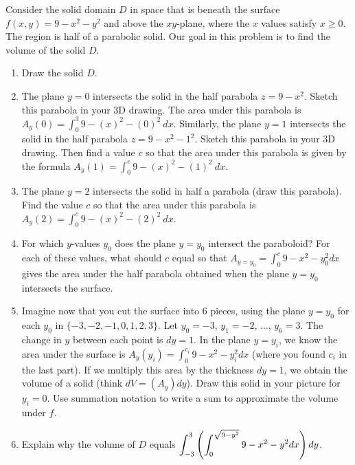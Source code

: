 \begin{problem}%
Consider the solid domain $D$ in space that is beneath the surface $f(x,y)=9-x^2-y^2$ and above the $xy$-plane, where the $x$ values satisfy $x\geq 0$.  The region is half of a parabolic solid.  Our goal in this problem is to find the volume of the solid $D$.
\begin{enumerate}
 \item Draw the solid $D$. 
 \item The plane $y=0$ intersects the solid in the half parabola $z=9-x^2$. Sketch this parabola in your 3D drawing. The area under this parabola is $A_y(0)= \int_0^3 9-(x)^2-(0)^2 \ dx$. 
 Similarly, the plane $y=1$ intersects the solid in the half parabola $z=9-x^2-1^2$. Sketch this parabola in your 3D drawing. Then find a value $c$ so that the area under this parabola is given by the formula $A_y(1)=\int_0^{c} 9-(x)^2-(1)^2 \ dx$.
 \item The plane $y=2$ intersects the solid in half a parabola (draw this parabola). Find the value $c$ so that the area under this parabola is $A_y(2)=\int_0^c 9-(x)^2-(2)^2 \ dx$.
 \item {}
For which $y$-values $y_0$ does the plane $y=y_0$ intersect the paraboloid? For each of these values, what should $c$ equal so that $A_{y=y_0} = \int_0^c 9-x^2-y_0^2 dx$ gives the area under the half parabola obtained when the plane $y=y_0$ intersects the surface. 
 \item Imagine now that you cut the surface into 6 pieces, using the plane $y=y_0$ for each $y_0$ in $\{-3,-2,-1,0, 1, 2,3\}$. Let $y_0=-3$, $y_1=-2$, $\ldots$, $y_{6}=3$. The change in $y$ between each point is $dy=1$. 
 In the plane $y=y_i$, we know the area under the surface is $A_y(y_i) = \int_0^{c_i} 9-x^2-y_i^2 dx$ (where you found $c_i$ in the last part).  If we multiply this area by the thickness $dy=1$, we obtain the volume of a solid (think $dV = (A_y)dy$).  Draw this solid in your picture for $y_i = 0$. Use summation notation to write a sum to approximate the volume under $f$.
\item Explain why the volume of $D$ equals $\displaystyle\int_{-3}^{3} \left(\int_0^{\sqrt{9-y^2}}9-x^2-y^2 dx\right) dy$.
\end{enumerate}
\end{problem}
